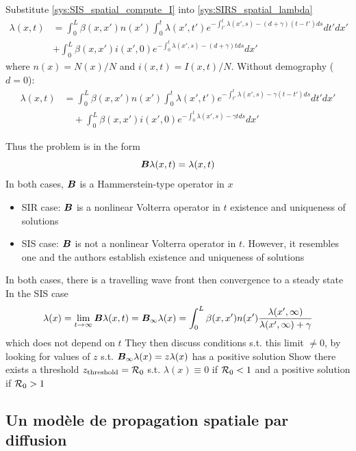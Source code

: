 \documentclass[aspectratio=169]{beamer}\usepackage[]{graphicx}\usepackage[]{xcolor}
\begin{document}
\begin{frame}
Substitute \eqref{sys:SIS_spatial_compute_I} into \eqref{sys:SIRS_spatial_lambda}
\[
\begin{aligned}
\lambda(x,t) &=
\int_0^L \beta(x,x')n(x')
\int_0^t \lambda(x',t')
e^{-\int_{t'}^t \lambda(x',s)-(d+\gamma)(t-t')ds}dt'dx' \\
&+\int_0^L \beta(x,x')i(x',0)
e^{-\int_0^t \lambda(x',s)-(d+\gamma)t ds}dx'
\end{aligned}
\]
where $n(x)=N(x)/N$ and $i(x,t)=I(x,t)/N$. Without demography ($d=0$):
\[
\begin{aligned}
\lambda(x,t) &=
\int_0^L \beta(x,x')n(x')
\int_0^t \lambda(x',t')
e^{-\int_{t'}^t \lambda(x',s)-\gamma(t-t')ds}dt'dx' \\
&\quad +\int_0^L \beta(x,x')i(x',0)
e^{-\int_0^t \lambda(x',s)-\gamma t ds}dx'
\end{aligned}
\]
\end{frame}


\begin{frame}
Thus the problem is in the form
\[
\bm{B}\lambda(x,t)=\lambda(x,t)
\]
\vfill
In both cases, $\bm{B}$ is a Hammerstein-type operator in $x$
\vfill
\begin{itemize}
\item SIR case: $\bm{B}$ is a nonlinear Volterra operator in $t$ \imply existence and uniqueness of solutions
\vfill
\item SIS case: $\bm{B}$ is not a nonlinear Volterra operator in $t$. However, it resembles one and the authors establish existence and uniqueness of solutions
\end{itemize}
\end{frame}


\begin{frame}
In both cases, there is a travelling wave front then convergence to a steady state
\vfill
In the SIS case
\[
\lambda(x)=\lim_{t\to\infty}\bm{B}\lambda(x,t)
=\bm{B}_\infty\lambda(x)=
\int_0^L\beta(x,x')n(x')
\frac{\lambda(x',\infty)}{\lambda(x',\infty)+\gamma}
\]
which does not depend on $t$
\vfill 
They then discuss conditions s.t. this limit $\neq 0$, by looking for values of $z$ s.t. $\bm{B}_\infty\lambda(x)=z\lambda(x)$ has a positive solution
\vfill
Show there exists a threshold $z_{\text{threshold}}=\mathcal{R}_0$ s.t. $\lambda(x)\equiv 0$ if $\mathcal{R}_0<1$ and a positive solution if $\mathcal{R}_0>1$
\end{frame}


\subsection{Un modèle de propagation spatiale par diffusion}
\end{document}
